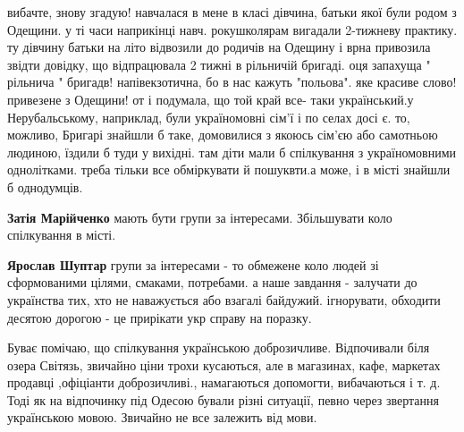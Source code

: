 \begin{itemize}
вибачте, знову згадую! навчалася в мене в класі дівчина, батьки якої були родом
з Одещини. у ті часи наприкінці навч. рокушколярам вигадали 2-тижневу практику.
ту дівчину батьки на літо відвозили до родичів на Одещину і врна привозила
звідти довідку, що відпрацювала 2 тижні в рільничій бригаді. оця запахуща "
рільнича " бригадв! напівекзотична, бо в нас кажуть "польова". яке красиве
слово! привезене з Одещини! от і подумала, що той край все- таки український.у
Нерубальському, наприклад, були україномовні сім'ї і по селах досі є. то,
можливо, Бригарі знайшли б таке, домовилися з якоюсь сім'єю або самотньою
людиною, їздили б туди у вихідні. там діти мали б спілкування з україномовними
однолітками. треба тільки все обміркувати й пошуквти.а може, і в місті знайшли
б однодумців.

\begin{itemize}
 
\textbf{Затія Марійченко} мають бути групи за інтересами. Збільшувати коло спілкування в місті.

 
\textbf{Ярослав Шуптар} групи за інтересами - то обмежене коло людей зі
сформованими цілями, смаками, потребами. а наше завдання - залучати до
українства тих, хто не наважується або взагалі байдужий. ігнорувати, обходити
десятою дорогою - це прирікати укр справу на поразку.
\end{itemize}

 

Буває помічаю, що спілкування українською доброзичливе. Відпочивали біля озера
Світязь, звичайно ціни трохи кусаються, але в магазинах, кафе, маркетах продавці
,офіціанти доброзичливі., намагаються допомогти, вибачаються і т. д. Тоді як на
відпочинку під Одесою бували різні ситуації, певно через звертання українською
мовою. Звичайно не все залежить від мови.


\end{itemize}
